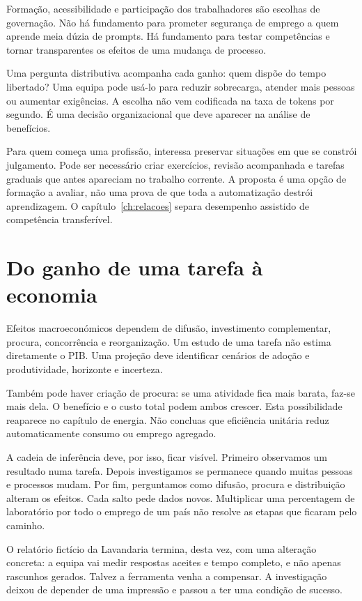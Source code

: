 Formação, acessibilidade e participação dos trabalhadores são escolhas de governação. Não há fundamento para prometer segurança de emprego a quem aprende meia dúzia de prompts. Há fundamento para testar competências e tornar transparentes os efeitos de uma mudança de processo.

Uma pergunta distributiva acompanha cada ganho: quem dispõe do tempo libertado? Uma equipa pode usá-lo para reduzir sobrecarga, atender mais pessoas ou aumentar exigências. A escolha não vem codificada na taxa de tokens por segundo. É uma decisão organizacional que deve aparecer na análise de benefícios.

Para quem começa uma profissão, interessa preservar situações em que se constrói julgamento. Pode ser necessário criar exercícios, revisão acompanhada e tarefas graduais que antes apareciam no trabalho corrente. A proposta é uma opção de formação a avaliar, não uma prova de que toda a automatização destrói aprendizagem. O capítulo~\ref{ch:relacoes} separa desempenho assistido de competência transferível.

\section{Do ganho de uma tarefa à economia}
Efeitos macroeconómicos dependem de difusão, investimento complementar, procura, concorrência e reorganização. Um estudo de uma tarefa não estima diretamente o PIB. Uma projeção deve identificar cenários de adoção e produtividade, horizonte e incerteza.

Também pode haver criação de procura: se uma atividade fica mais barata, faz-se mais dela. O benefício e o custo total podem ambos crescer. Esta possibilidade reaparece no capítulo de energia. Não concluas que eficiência unitária reduz automaticamente consumo ou emprego agregado.

A cadeia de inferência deve, por isso, ficar visível. Primeiro observamos um resultado numa tarefa. Depois investigamos se permanece quando muitas pessoas e processos mudam. Por fim, perguntamos como difusão, procura e distribuição alteram os efeitos. Cada salto pede dados novos. Multiplicar uma percentagem de laboratório por todo o emprego de um país não resolve as etapas que ficaram pelo caminho.

O relatório fictício da Lavandaria termina, desta vez, com uma alteração concreta: a equipa vai medir respostas aceites e tempo completo, e não apenas rascunhos gerados. Talvez a ferramenta venha a compensar. A investigação deixou de depender de uma impressão e passou a ter uma condição de sucesso.

